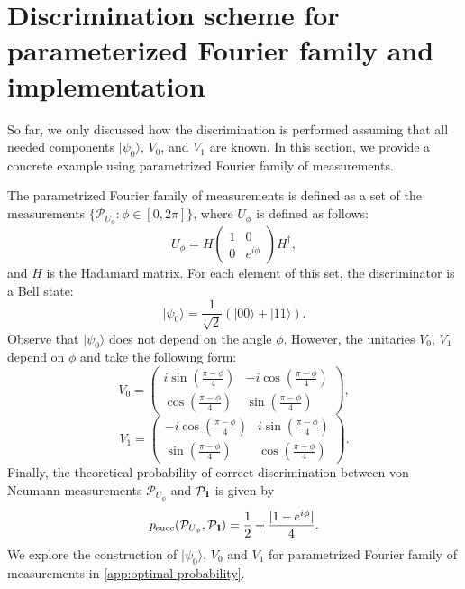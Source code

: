 \documentclass[preprint,12pt, a4paper, dvipsnames]{elsarticle}
\newcommand{\ket}[1]{\ensuremath{|#1\rangle}}
\newcommand{\1}{{\rm 1\hspace{-0.9mm}l}}
\newcommand{\Id}{{\rm 1\hspace{-0.9mm}l}}
\newcommand{\PP}{\mathcal{P}}
\theoremstyle{definition}
\begin{document}
\section{Discrimination scheme for parameterized Fourier family and implementation}
\label{sec:fourier}
So far, we only discussed how the discrimination is performed assuming that all needed components
$\ket{\psi_0}$, $V_0$, and $V_1$ are known. In this section, we provide a concrete example using
parametrized Fourier family of measurements.

The parametrized Fourier family of measurements is defined as a set of the measurements
$\{\PP_{U_\phi}\colon \phi \in [0, 2\pi]\}$, where $U_\phi$ is defined as follows:
\begin{equation}
U_\phi = H
\left(\begin{array}{cc}1&0\\0&e^{i \phi}\end{array}\right)  H^\dagger,
\end{equation}
and $H$ is the Hadamard matrix. For each element of this set, the discriminator is a Bell state:
\begin{equation}
\ket{\psi_{0}} = \frac{1}{\sqrt{2}} \left( \ket{00} + \ket{11} \right).
\end{equation}
Observe that $\ket{\psi_0}$ does not depend on the angle $\phi$. However, the unitaries $V_0$,
$V_1$ depend on $\phi$ and take the following form:
\begin{equation}
V_0 = \left(\begin{array}{cc}i \sin\left( \frac{\pi - \phi}{4} \right)&-i
\cos\left( \frac{\pi - \phi}{4} \right)\\ \cos\left( \frac{\pi -
	\phi}{4}\right)& \sin\left( \frac{\pi - \phi}{4} \right)\end{array}\right),
\end{equation}
\begin{equation}
V_1 = \left(\begin{array}{cc}-i \cos\left(\frac{\pi - \phi}{4}\right) &i
\sin\left( \frac{\pi - \phi}{4}\right)\\\sin\left( \frac{\pi - \phi}{4} \right)
&  \cos\left( \frac{\pi - \phi}{4} \right) \end{array}\right).
\end{equation}
Finally, the theoretical probability of correct discrimination between von Neumann
measurements $\PP_{U_\phi}$ and $\PP_{\Id}$ is given by
\begin{equation}
p_{\text{succ}}(\PP_{U_\phi}, \PP_{\Id}) = \frac{1}{2} + \frac{|1 - e^{i \phi}  |}{4} .
\end{equation}
We explore the construction of $\ket{\psi_0}$, $V_0$ and $V_1$ for parametrized Fourier family of measurements in
\ref{app:optimal-probability}.
\end{document}
